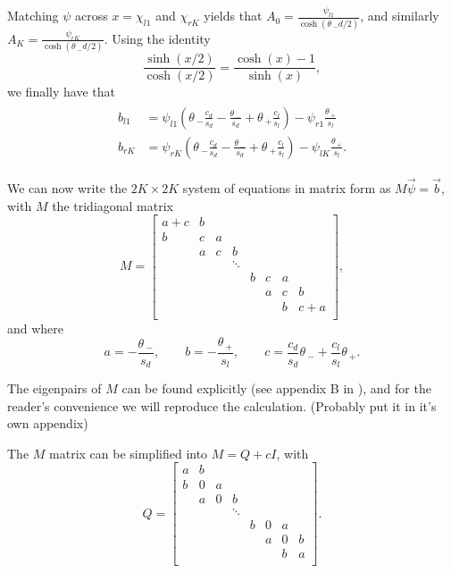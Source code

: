 \documentclass[a4paper,10pt]{article}
\newcommand{\tH}{\ensuremath{\theta\,}}
\begin{document}
Matching $\psi$ across $x=\chi_{l1}$ and $\chi_{rK}$ yields that $A_0 = \frac{\psi_{l1}}{\cosh(\tH_-d/2)}$, and similarly $A_K = \frac{\psi_{rK}}{\cosh(\tH_-d/2)}$. Using the identity
% 
\[
\frac{\sinh(x/2)}{\cosh(x/2)} = \frac{\cosh(x)-1}{\sinh(x)},
\]
% 
we finally have that 
% 
\begin{equation}
\label{eqn:psi_eval_b1K}
\begin{split}
\begin{aligned}
  b_{l1} &= \psi_{l1}\left(\tH_-\frac{c_d}{s_d} - \frac{\tH_-}{s_d} + \tH_+\frac{c_l}{s_l} \right) - \psi_{r1}\frac{\tH_+}{s_l}\\
  b_{rK} &= \psi_{rK}\left(\tH_-\frac{c_d}{s_d} - \frac{\tH_-}{s_d} + \tH_+\frac{c_l}{s_l} \right) - \psi_{lK}\frac{\tH_+}{s_l}.
\end{aligned}
\end{split}
\end{equation}

We can now write the $2K\times2K$ system of equations in matrix form as $M\vec{\psi} = \vec{b}$, with $M$ the tridiagonal matrix
% 
\[
  M 
  = \left[
	\begin{matrix}
	  a+c & b \\
	  b & c & a \\
	  & a &c & b \\
	  & & & \ddots \\
	  & & & & b & c & a\\
	  & & & & & a & c & b\\
	  & & & & & & b & c + a\\
	\end{matrix}\right],
\]
% 
and where
% 
\[
  a = -\frac{\tH_-}{s_d},\qquad b = - \frac{\tH_+}{s_l},\qquad c = \frac{c_d}{s_d}\tH_-+\frac{c_l}{s_l}\tH_+.
\]

The eigenpairs of $M$ can be found explicitly (see appendix B in \cite{ren_spectra_2003}), and for the reader's convenience we will reproduce the calculation. (Probably put it in it's own appendix)

The $M$ matrix can be simplified into $M = Q + cI$, with 
% 
\[
  Q 
  = \left[
	\begin{matrix}
	  a & b \\
	  b & 0 & a \\
	  & a &0 & b \\
	  & & & \ddots \\
	  & & & & b & 0 & a\\
	  & & & & & a & 0 & b\\
	  & & & & & & b & a\\
	\end{matrix}\right].
\]
% 
\end{document}
